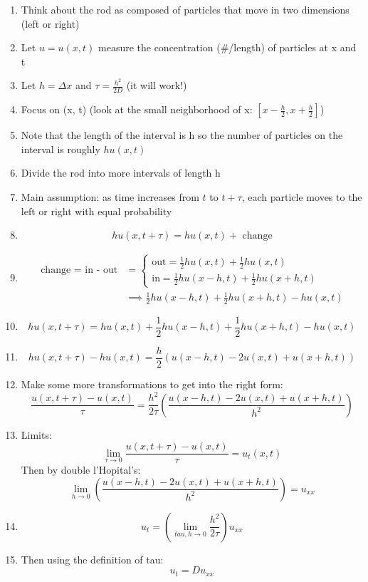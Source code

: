 \documentclass[12pt]{article}
\newcommand{\ans}[1]{\boxed{\text{#1}}}
\begin{document}
\begin{enumerate}
    \item Think about the rod as composed of particles that move in two dimensions (left or right)
    \item Let $u = u(x, t)$ measure the concentration (\#/length) of particles at x and t
    \item Let $h = \Delta x$ and $\tau = \frac{h^2}{2D}$ (it will work!)
    \item Focus on (x, t) (look at the small neighborhood of x: $[x - \frac{h}{2}, x + \frac{h}{2}]$)
    \item Note that the length of the interval is h so the number of particles on the interval is roughly $hu(x, t)$
    \item Divide the rod into more intervals of length h
    \item Main assumption: as time increases from $t$ to $t + \tau$, each particle moves to the left or right with equal probability 
    \item \[hu(x, t + \tau) = hu(x, t) + \text{ change}\]
    \item \begin{align*}
        \text{change = in - out} &= \begin{cases}
            \text{out} =  \frac{1}{2}hu(x, t) + \frac{1}{2}hu(x, t)\\
            \text{in} = \frac{1}{2}hu(x - h, t) + \frac{1}{2}hu(x + h, t)
        \end{cases}\\
        & \implies \frac{1}{2}hu(x - h, t) + \frac{1}{2}hu(x + h, t) - hu(x, t)
    \end{align*}
    \item \[hu(x, t + \tau) = hu(x, t) + \frac{1}{2}hu(x - h, t) + \frac{1}{2}hu(x + h, t) - hu(x, t)\]
    \item \[hu(x, t + \tau) - hu(x, t) = \frac{h}{2}\left(u(x - h, t) - 2u(x, t) + u(x + h, t)\right)\]
    \item Make some more transformations to get into the right form:
    \[\frac{u(x, t + \tau) - u(x, t)}{\tau} = \frac{h^2}{2\tau}\left(\frac{u(x -h, t) - 2u(x, t) + u(x+ h, t)}{h^2}\right)\]
    \item Limits:
    \[\lim_{\tau \to 0} \frac{u(x, t + \tau) - u(x, t)}{\tau} = u_t(x, t)\]
    Then by double l'Hopital's: 
    \[\lim_{h \to 0}\left(\frac{u(x -h, t) - 2u(x, t) + u(x+ h, t)}{h^2}\right) = u_{xx}\]
    \item \[u_t = \left(\lim_{tau, h \to 0} \frac{h^2}{2\tau}\right)u_{xx}\]
    \item Then using the definition of tau:
    \[\ans{$u_t = Du_{xx}$}\]
\end{enumerate}
\end{document}

